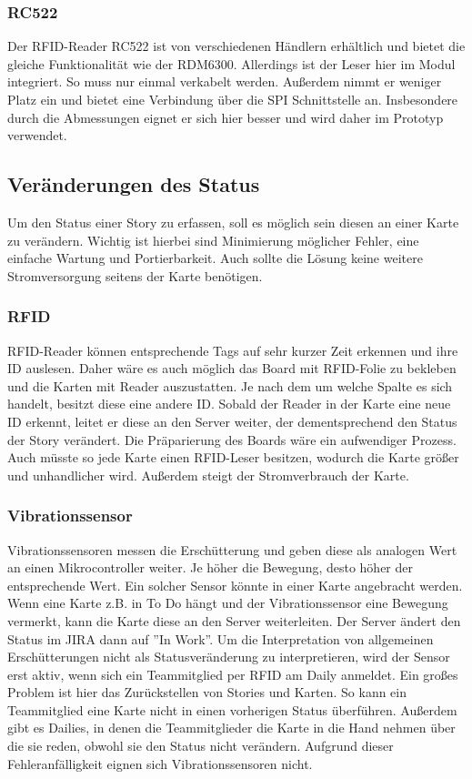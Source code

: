 \documentclass[12pt,titlepage]{scrartcl}
\begin{document}
			\subsubsection{RC522}
			Der RFID-Reader RC522 ist von verschiedenen Händlern erhältlich und bietet die gleiche Funktionalität wie der RDM6300. Allerdings ist der Leser hier im Modul integriert. So muss nur einmal verkabelt werden. Außerdem nimmt er weniger Platz ein und bietet eine Verbindung über die SPI Schnittstelle an. Insbesondere durch die Abmessungen eignet er sich hier besser und wird daher im Prototyp verwendet.
		\subsection{Veränderungen des Status} \label{changeStatus}
		Um den Status einer Story zu erfassen, soll es möglich sein diesen an einer Karte zu verändern. Wichtig ist hierbei sind Minimierung möglicher Fehler, eine einfache Wartung und Portierbarkeit. Auch sollte die Lösung keine weitere Stromversorgung seitens der Karte benötigen.
			\subsubsection{RFID}
			RFID-Reader können entsprechende Tags auf sehr kurzer Zeit erkennen und ihre ID auslesen. Daher wäre es auch möglich das Board mit RFID-Folie zu bekleben und die Karten mit Reader auszustatten. Je nach dem um welche Spalte es sich handelt, besitzt diese eine andere ID. Sobald der Reader in der Karte eine neue ID erkennt, leitet er diese an den Server weiter, der dementsprechend den Status der Story verändert. Die Präparierung des Boards wäre ein aufwendiger Prozess. Auch müsste so jede Karte einen RFID-Leser besitzen, wodurch die Karte größer und unhandlicher wird. Außerdem steigt der Stromverbrauch der Karte.
			\subsubsection{Vibrationssensor}
			Vibrationssensoren messen die Erschütterung und geben diese als analogen Wert an einen Mikrocontroller weiter. Je höher die Bewegung, desto höher der entsprechende Wert. Ein solcher Sensor könnte in einer Karte angebracht werden. Wenn eine Karte z.B. in To Do hängt und der Vibrationssensor eine Bewegung vermerkt, kann die Karte diese an den Server weiterleiten. Der Server ändert den Status im JIRA dann auf ''In Work''. Um die Interpretation von allgemeinen Erschütterungen nicht als Statusveränderung zu interpretieren, wird der Sensor erst aktiv, wenn sich ein Teammitglied per RFID am Daily anmeldet. Ein großes Problem ist hier das Zurückstellen von Stories und Karten. So kann ein Teammitglied eine Karte nicht in einen vorherigen Status überführen. Außerdem gibt es Dailies, in denen die Teammitglieder die Karte in die Hand nehmen über die sie reden, obwohl sie den Status nicht verändern. Aufgrund dieser Fehleranfälligkeit eignen sich Vibrationssensoren nicht.
\end{document}
